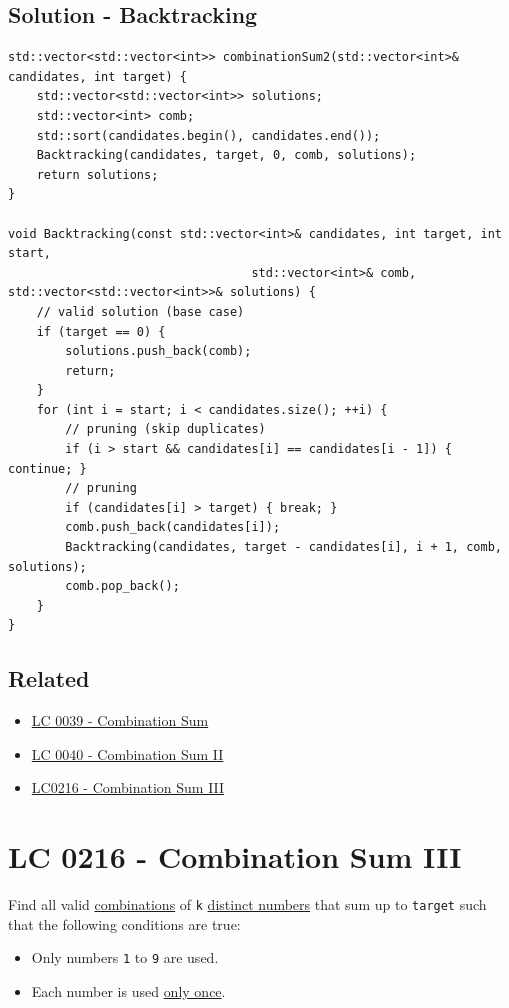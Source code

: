 \subsection*{Solution - Backtracking}
\begin{lstlisting}
std::vector<std::vector<int>> combinationSum2(std::vector<int>& candidates, int target) {
	std::vector<std::vector<int>> solutions;
	std::vector<int> comb;
	std::sort(candidates.begin(), candidates.end());
	Backtracking(candidates, target, 0, comb, solutions);
	return solutions;
}

void Backtracking(const std::vector<int>& candidates, int target, int start, 
								  std::vector<int>& comb, std::vector<std::vector<int>>& solutions) {
	// valid solution (base case)
	if (target == 0) {
		solutions.push_back(comb);
		return;
	}
	for (int i = start; i < candidates.size(); ++i) {
		// pruning (skip duplicates)
		if (i > start && candidates[i] == candidates[i - 1]) { continue; }
		// pruning
		if (candidates[i] > target) { break; }
		comb.push_back(candidates[i]);
		Backtracking(candidates, target - candidates[i], i + 1, comb, solutions);
		comb.pop_back();
	}
}
\end{lstlisting}

\subsection*{Related}
\begin{itemize}
	\item \hyperref[lc0039]{LC 0039 - Combination Sum}
	\item \hyperref[lc0040]{LC 0040 - Combination Sum II}
	\item \hyperref[lc0216]{LC0216 - Combination Sum III}
\end{itemize}

\section{LC 0216 - Combination Sum III}\label{lc0216}
Find all valid \ul{combinations} of {\colorbox{CodeBackground}{\lstinline|k|}} \ul{distinct numbers} that sum up to {\colorbox{CodeBackground}{\lstinline|target|}} such that the following conditions are true:
\begin{itemize}
	\item Only numbers {\colorbox{CodeBackground}{\lstinline|1|}} to {\colorbox{CodeBackground}{\lstinline|9|}} are used.
	\item Each number is used \ul{only once}.
\end{itemize}

